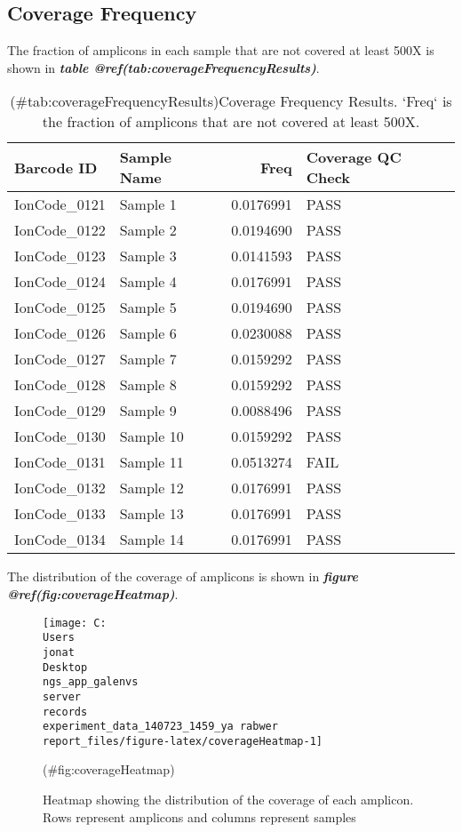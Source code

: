 \documentclass[
]{article}
\begin{document}
\hypertarget{coverage-frequency}{%
\subsection{Coverage Frequency}\label{coverage-frequency}}

The fraction of amplicons in each sample that are not covered at least 500X is shown in \textbf{\emph{table @ref(tab:coverageFrequencyResults)}}.

\begin{longtable}[t]{llrl}
\caption{(\#tab:coverageFrequencyResults)Coverage Frequency Results. `Freq` is the fraction of amplicons that are not covered at least 500X.}\\
\toprule
Barcode ID & Sample Name & Freq & Coverage QC Check\\
\midrule
IonCode\_0121 & Sample 1 & 0.0176991 & PASS\\
IonCode\_0122 & Sample 2 & 0.0194690 & PASS\\
IonCode\_0123 & Sample 3 & 0.0141593 & PASS\\
IonCode\_0124 & Sample 4 & 0.0176991 & PASS\\
IonCode\_0125 & Sample 5 & 0.0194690 & PASS\\
\addlinespace
IonCode\_0126 & Sample 6 & 0.0230088 & PASS\\
IonCode\_0127 & Sample 7 & 0.0159292 & PASS\\
IonCode\_0128 & Sample 8 & 0.0159292 & PASS\\
IonCode\_0129 & Sample 9 & 0.0088496 & PASS\\
IonCode\_0130 & Sample 10 & 0.0159292 & PASS\\
\addlinespace
IonCode\_0131 & Sample 11 & 0.0513274 & FAIL\\
IonCode\_0132 & Sample 12 & 0.0176991 & PASS\\
IonCode\_0133 & Sample 13 & 0.0176991 & PASS\\
IonCode\_0134 & Sample 14 & 0.0176991 & PASS\\
\bottomrule
\end{longtable}

The distribution of the coverage of amplicons is shown in \textbf{\emph{figure @ref(fig:coverageHeatmap)}}.

\begin{figure}
\texttt{[image: C:\\Users\\jonat\\Desktop\\ngs\_app\_galenvs\\server\\records\\experiment\_data\_140723\_1459\_ya rabwer\\report\_files/figure-latex/coverageHeatmap-1]} \caption[Coverage Heatmap]{Heatmap showing the distribution of the coverage of each amplicon. Rows represent amplicons and columns represent samples}(\#fig:coverageHeatmap)
\end{figure}
\end{document}
